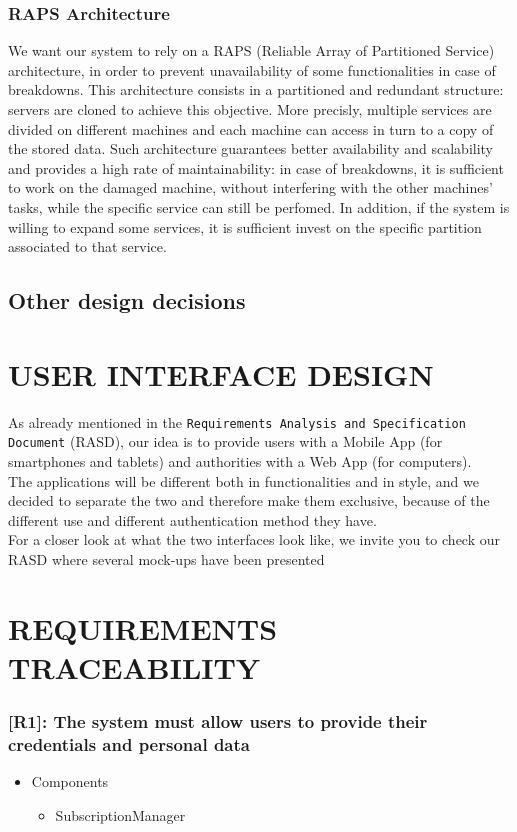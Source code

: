 \documentclass[12pt,a4paper]{article}
\begin{document}
\subsubsection{RAPS Architecture}
We want our system to rely on a RAPS (Reliable Array of Partitioned Service) architecture, in order to prevent unavailability of some functionalities in case of breakdowns. This architecture consists in a partitioned and redundant structure: servers are cloned to achieve this objective. More precisly, multiple services are divided on different machines and each machine can access in turn to a copy of the stored data. Such architecture guarantees better availability and scalability and provides a high rate of maintainability: in case of breakdowns, it is sufficient to work on the damaged machine, without interfering with the other machines' tasks, while the specific service can still be perfomed. In addition, if the system is willing to expand some services, it is sufficient invest
on the specific partition associated to that service.
\subsection{Other design decisions}

\section{USER INTERFACE DESIGN}
As already mentioned in the \texttt{Requirements Analysis and Specification Document} (RASD), our idea is to provide users with a Mobile App (for smartphones and tablets) and authorities with a Web App (for computers).\\ The applications will be different both in functionalities and in style, and we decided to separate the two and therefore make them exclusive, because of the different use and different authentication method they have.\\ For a closer look at what the two interfaces look like, we invite you to check our RASD where several mock-ups have been presented
\section{REQUIREMENTS TRACEABILITY}
\subsubsection*{[R1]: The system must allow users to provide their credentials and personal data}
\begin{itemize}
\item Components
\begin{itemize}
\item SubscriptionManager
\end{itemize}
\end{itemize}
\end{document}
